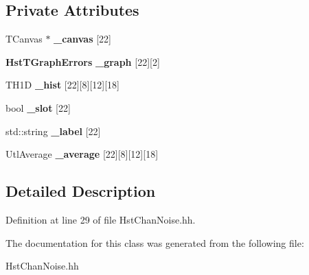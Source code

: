 \subsection*{Private Attributes}
\begin{DoxyCompactItemize}
\item 
TCanvas $\ast$ {\bfseries \_\-canvas} [22]\label{classHstChanNoise_afca4c54c58f90144d08e96e5a713bb08}

\item 
{\bf HstTGraphErrors} {\bfseries \_\-graph} [22][2]\label{classHstChanNoise_aa8edb46e9f86b2d65e27733f43a97c56}

\item 
TH1D {\bfseries \_\-hist} [22][8][12][18]\label{classHstChanNoise_af5b44ba98a96215f69c9ea43b91609f0}

\item 
bool {\bfseries \_\-slot} [22]\label{classHstChanNoise_a3c3276da2e7ad7d8be0d68e4acdd58f9}

\item 
std::string {\bfseries \_\-label} [22]\label{classHstChanNoise_a2ed69a9688c335106a0695c001048592}

\item 
UtlAverage {\bfseries \_\-average} [22][8][12][18]\label{classHstChanNoise_a616ded317f4c23c9297c8474511515ef}

\end{DoxyCompactItemize}


\subsection{Detailed Description}


Definition at line 29 of file HstChanNoise.hh.

The documentation for this class was generated from the following file:\begin{DoxyCompactItemize}
\item 
HstChanNoise.hh\end{DoxyCompactItemize}
